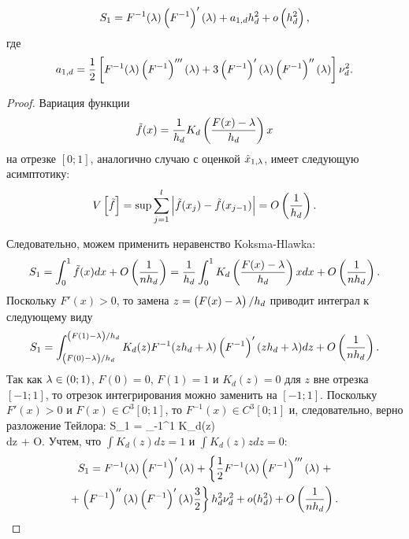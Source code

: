 \documentclass[a4paper,14pt,russian]{article}
\begin{document}
\begin{lemma}
\begin{equation*}
S_1 =   F^{-1} (\lambda) \left(F^{-1}\right)'(\lambda) +a_{1,d}h_d^2 + o\left(h_d^2\right),
\end{equation*}
где
\begin{equation}
  a_{1,d} = \frac12\left[F^{-1} (\lambda) \left(F^{-1}\right)'''(\lambda) + 3\left(F^{-1}\right)'(\lambda)\left(F^{-1}\right)''(\lambda)\right]\nu_d^2.
\end{equation}
\end{lemma}
\begin{proof}
 Вариация функции
$$
\tilde{f}(x) = \frac{1}{h_d} K_d\left(\frac{F(x)-\lambda}{h_d}\right)x
$$
на отрезке $[0;1]$, аналогично случаю с оценкой $\hat{x}_{1,\lambda}$, имеет следующую асимптотику:
\begin{equation*}
V\left[\tilde{f}\right]= \sup \sum_{j=1}^l \left|\tilde{f}(x_j)-\tilde{f}(x_{j-1})\right| = O\left(\frac{1}{h_d}\right).
\end{equation*}

Следовательно, можем применить неравенство Koksma-Hlawka:
$$
S_1 =\int_0^1 \tilde{f}(x) dx + O\left(\frac{1}{n h_d}\right)=  \frac{1}{h_d} \int_0^1 K_d\left(\frac{F(x)-\lambda}{h_d}\right)xdx + O\left(\frac{1}{n h_d}\right).
$$
Поскольку $F'(x)>0$, то замена $z=\left(F(x)-\lambda\right)/{h_d}$ приводит интеграл к следующему виду
$$
S_1 = \int_{\left(F(0)-\lambda\right)/h_d}^{\left(F(1)-\lambda\right)/h_d} K_d(z)F^{-1}(z h_d + \lambda)\left(F^{-1}\right)'(z h_d + \lambda)dz + O\left(\frac{1}{n h_d}\right).
$$
Так как $\lambda \in (0;1)$, $F(0)=0$, $F(1)=1$ и $K_d(z)=0$ для $z$ вне отрезка $[-1;1]$, то отрезок интегрирования можно заменить  на $[-1;1]$. Поскольку $F'(x)>0$ и $F(x) \in C^3[0;1]$, то $F^{-1}(x) \in C^3[0;1]$ и, следовательно, верно разложение Тейлора:
\ml
{
S_1 = \int_{-1}^{1} K_d(z)  \times \\
 \times {}dz + O.
}
Учтем, что $\int K_d(z)dz = 1$ и $\int K_d(z)zdz =0$:
\begin{multline*}
S_1 = F^{-1} (\lambda) \left(F^{-1}\right)'(\lambda) +\left\{\frac12 F^{-1} (\lambda) \left(F^{-1}\right)'''(\lambda) \right.+\\+\left.\left(F^{-1}\right)''(\lambda) \left(F^{-1}\right)'(\lambda)\frac32\right\}h_d^2 \nu_d^2
+ o(h_d^2) + O\left(\frac{1}{n h_d}\right).
\end{multline*}

\end{proof}
\end{document}
